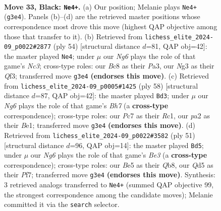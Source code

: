 \documentclass[11pt]{article}
\begin{document}
\clearpage

\begin{figure}[p]\centering
\begin{subfigure}{0.46\textwidth}\centering
\resizebox{\linewidth}{!}{%
\newchessgame
\chessboard[
  setfen={r1b5/ppp2ppk/7p/3qb3/BQ6/5PnP/PP4PK/R1B5 b - - 7 33},
  showmover=false,
  pgfstyle=straightmove, color=movearrow, markmove={g3-e4}
]}
\caption{}
\end{subfigure}\hfill
\begin{subfigure}{0.46\textwidth}\centering
\resizebox{\linewidth}{!}{%
\newchessgame
\chessboard[
  setfen={2r2k1r/1p3ppp/2b4q/p3BB2/3p2P1/P1N2Q2/1P3P1P/4R1K1 w - - 0 28},
  showmover=false,
  pgfstyle=straightmove, color=movearrow, markmove={c3-e4}
]}
\caption{}
\end{subfigure}
\\[4pt]
\begin{subfigure}{0.46\textwidth}\centering
\resizebox{\linewidth}{!}{%
\newchessgame
\chessboard[
  setfen={2r4k/4bppB/bqp1p2p/8/1p1P4/4P2P/1PQ2PP1/2R1B1K1 w - - 13 30},
  showmover=false,
  pgfstyle=straightmove, color=movearrow, markmove={h7-d3}
]}
\caption{}
\end{subfigure}\hfill
\begin{subfigure}{0.46\textwidth}\centering
\resizebox{\linewidth}{!}{%
\newchessgame
\chessboard[
  setfen={1q6/1P3pbk/1BQ1bnpp/p3p3/1p6/6P1/P3PP1P/3R2K1 b - - 1 26},
  showmover=false,
  pgfstyle=straightmove, color=movearrow, markmove={e6-d5}
]}
\caption{}
\end{subfigure}
\caption{\textbf{Move 33, Black: \texttt{Ne4+}.} (a) Our position; Melanie plays \texttt{Ne4+} (\texttt{g3e4}). Panels (b)--(d) are the retrieved master positions whose correspondence most drove this move (highest QAP objective among those that transfer to it). (b) Retrieved from \texttt{lichess\_elite\_2024-09\_p0022\#2877} (ply 54) [structural distance $d$=81, QAP obj=42]: the master played \texttt{Ne4}; under $\mu$ our \emph{Ng6} plays the role of that game's \emph{Nc3}; cross-type roles: our \emph{B}c8 as their \emph{P}a3, our \emph{N}g3 as their \emph{Q}f3; transferred move \texttt{g3e4} \textbf{(endorses this move)}. (c) Retrieved from \texttt{lichess\_elite\_2024-09\_p0005\#1425} (ply 58) [structural distance $d$=87, QAP obj=42]: the master played \texttt{Bd3}; under $\mu$ our \emph{Ng6} plays the role of that game's \emph{Bh7} (a \textbf{cross-type} correspondence); cross-type roles: our \emph{P}c7 as their \emph{R}c1, our \emph{p}a2 as their \emph{B}e1; transferred move \texttt{g3e4} \textbf{(endorses this move)}. (d) Retrieved from \texttt{lichess\_elite\_2024-09\_p0022\#3582} (ply 51) [structural distance $d$=96, QAP obj=14]: the master played \texttt{Bd5}; under $\mu$ our \emph{Ng6} plays the role of that game's \emph{Be3} (a \textbf{cross-type} correspondence); cross-type roles: our \emph{B}e5 as their \emph{Q}b8, our \emph{Q}d5 as their \emph{P}f7; transferred move \texttt{g3e4} \textbf{(endorses this move)}. Synthesis: 3 retrieved analogs transferred to \texttt{Ne4+} (summed QAP objective 99, the strongest correspondence among the candidate moves); Melanie committed it via the \texttt{search} selector.}
\label{fig:thought-m65}
\end{figure}
\end{document}
